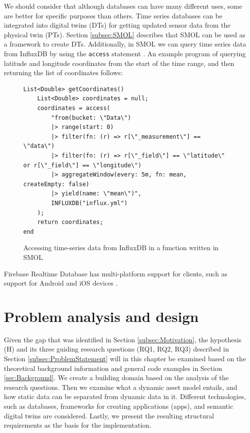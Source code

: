 \documentclass{article}
\begin{document}
We should consider that although databases can have many different uses, some are better for specific purposes than others. Time series databases can be integrated into digital twins (DTs) for getting updated sensor data from the physical twin (PTs). Section \ref{subsec:SMOL} describes that SMOL can be used as a framework to create DTs. Additionally, in SMOL we can query time series data from InfluxDB by using the \verb|access| statement \cite{noauthor_time_nodate}. An example program of querying latitude and longitude coordinates from the start of the time range, and then returning the list of coordinates follows:

\begin{figure}[H]
    \centering
    \begin{Verbatim}[frame=single,breaklines=true]
List<Double> getCoordinates()
    List<Double> coordinates = null;
    coordinates = access(
        "from(bucket: \"Data\")
        |> range(start: 0)
        |> filter(fn: (r) => r[\"_measurement\"] == \"data\")
        |> filter(fn: (r) => r[\"_field\"] == \"latitude\" or r[\"_field\"] == \"longitude\")
        |> aggregateWindow(every: 5m, fn: mean, createEmpty: false)
        |> yield(name: \"mean\")",
        INFLUXDB("influx.yml")
    );
    return coordinates;
end
    \end{Verbatim}
    \caption{Accessing time-series data from InfluxDB in a function written in SMOL}
    \label{fig:access_time_series}
\end{figure}
    

Firebase Realtime Database has multi-platform support for clients, such as support for Android and iOS devices \cite{noauthor_firebase_nodate}.



\newpage
\section{Problem analysis and design}\label{sec:Analysis}
Given the gap that was identified in Section \ref{subsec:Motivation}, the hypothesis (H) and its three guiding research questions (RQ1, RQ2, RQ3) described in Section \ref{subsec:ProblemStatement} will in this chapter be examined based on the theoretical background information and general code examples in Section \ref{sec:Background}. We create a building domain based on the analysis of the research questions. Then we examine what a dynamic asset model entails, and how static data can be separated from dynamic data in it. Different technologies, such as databases, frameworks for creating applications (apps), and semantic digital twins are considered. Lastly, we present the resulting structural requirements as the basis for the implementation.
\end{document}
